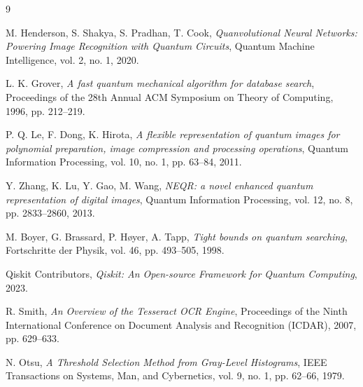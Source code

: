 \documentclass[11pt,a4paper]{article}
\begin{document}
\begin{thebibliography}{9}

M. Henderson, S. Shakya, S. Pradhan, T. Cook,
\emph{Quanvolutional Neural Networks: Powering Image Recognition with Quantum
Circuits}, Quantum Machine Intelligence, vol. 2, no. 1, 2020.

L. K. Grover,
\emph{A fast quantum mechanical algorithm for database search},
Proceedings of the 28th Annual ACM Symposium on Theory of Computing, 1996,
pp. 212--219.

P. Q. Le, F. Dong, K. Hirota,
\emph{A flexible representation of quantum images for polynomial preparation,
image compression and processing operations},
Quantum Information Processing, vol. 10, no. 1, pp. 63--84, 2011.

Y. Zhang, K. Lu, Y. Gao, M. Wang,
\emph{NEQR: a novel enhanced quantum representation of digital images},
Quantum Information Processing, vol. 12, no. 8, pp. 2833--2860, 2013.

M. Boyer, G. Brassard, P. H\o yer, A. Tapp,
\emph{Tight bounds on quantum searching},
Fortschritte der Physik, vol. 46, pp. 493--505, 1998.

Qiskit Contributors,
\emph{Qiskit: An Open-source Framework for Quantum Computing}, 2023.

R. Smith,
\emph{An Overview of the Tesseract OCR Engine},
Proceedings of the Ninth International Conference on Document Analysis and
Recognition (ICDAR), 2007, pp. 629--633.

N. Otsu,
\emph{A Threshold Selection Method from Gray-Level Histograms},
IEEE Transactions on Systems, Man, and Cybernetics, vol. 9, no. 1,
pp. 62--66, 1979.

\end{thebibliography}
\end{document}
